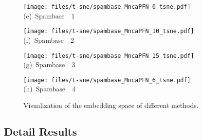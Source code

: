 \begin{figure*}[t]
    \begin{minipage}{0.24\linewidth}
    \texttt{[image: files/t-sne/spambase\_MncaPFN\_0\_tsne.pdf]}
    \centering
    {\small \mbox{(e) {Spambase \name~1}}}
    \end{minipage}
    \begin{minipage}{0.24\linewidth}
    \texttt{[image: files/t-sne/spambase\_MncaPFN\_10\_tsne.pdf]}
    \centering
    {\small \mbox{(f) {Spambase \name~2}}}
    \end{minipage}
    \begin{minipage}{0.24\linewidth}
    \texttt{[image: files/t-sne/spambase\_MncaPFN\_15\_tsne.pdf]}
    \centering
    {\small \mbox{(g) {Spambase \name~3}}}
    \end{minipage}
    \begin{minipage}{0.24\linewidth}
    \texttt{[image: files/t-sne/spambase\_MncaPFN\_6\_tsne.pdf]}
    \centering
    {\small \mbox{(h) {Spambase \name~4}}}
    \end{minipage}   
    
    \caption{Visualization of the embedding space of different methods.}
    \label{fig:visualize}
\end{figure*}

\subsection{Detail Results}

